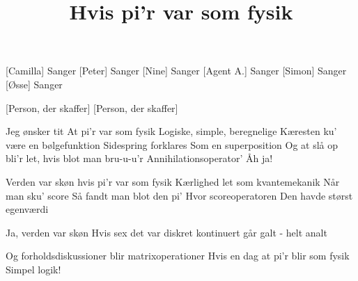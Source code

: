 \documentclass[a4paper,11pt]{article}
\title{Hvis pi'r var som fysik}
\begin{document}
\maketitle


\begin{roles}
[Camilla] Sanger
[Peter] Sanger
[Nine] Sanger
[Agent A.] Sanger
[Simon] Sanger
[Øsse] Sanger
\end{roles}

\begin{props}
    [Person, der skaffer]
    [Person, der skaffer]
\end{props}

\begin{song}

 Jeg ønsker tit
At pi'r var som fysik
Logiske, simple, beregnelige
Kæresten ku' være en bølgefunktion
Sidespring forklares
Som en superposition
Og at slå op bli'r let, hvis blot man bru-u-u'r
Annihilationsoperator'
Åh ja!

 Verden var skøn
hvis pi'r var som fysik
Kærlighed let
som kvantemekanik
Når man sku' score
Så fandt man blot den pi'
Hvor scoreoperatoren
Den havde størst egenværdi

 Ja, verden var skøn
Hvis sex det var diskret
kontinuert går galt - helt analt

 Og forholdsdiskussioner
blir matrixoperationer
Hvis en dag at pi'r
blir som fysik
Simpel logik!

\end{song}
\end{document}
